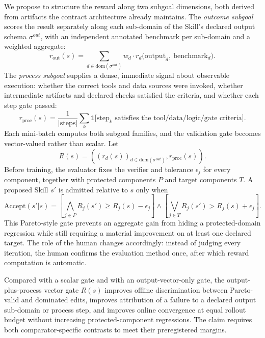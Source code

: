 We propose to structure the reward along two subgoal dimensions, both derived from artifacts the contract architecture already maintains. The \textit{outcome subgoal} scores the result separately along each sub-domain of the Skill's declared output schema $\sigma^{out}$, with an independent annotated benchmark per sub-domain and a weighted aggregate:
\begin{equation}
r_{\mathrm{out}}(s)=\sum_{d\in\mathrm{dom}(\sigma^{out})} w_d \cdot r_d\big(\mathrm{output}_d,\ \mathrm{benchmark}_d\big).
\end{equation}
The \textit{process subgoal} supplies a dense, immediate signal about observable execution: whether the correct tools and data sources were invoked, whether intermediate artifacts and declared checks satisfied the criteria, and whether each step gate passed:
\begin{equation}
r_{\mathrm{proc}}(s)=\frac{1}{|\mathrm{steps}|}\sum_k \mathbb{1}\big[\mathrm{step}_k \text{ satisfies the tool/data/logic/gate criteria}\big].
\end{equation}
Each mini-batch computes both subgoal families, and the validation gate becomes vector-valued rather than scalar. Let
\begin{equation}
R(s)=\left(\left(r_d(s)\right)_{d\in\mathrm{dom}(\sigma^{out})},r_{\mathrm{proc}}(s)\right).
\end{equation}
Before training, the evaluator fixes the verifier and tolerance $\epsilon_j$ for every component, together with protected components $P$ and target components $T$. A proposed Skill $s'$ is admitted relative to $s$ only when
\begin{equation}
\mathrm{Accept}(s'|s)=
\left[\bigwedge_{j\in P}R_j(s')\geq R_j(s)-\epsilon_j\right]
\land
\left[\bigvee_{j\in T}R_j(s')>R_j(s)+\epsilon_j\right].
\end{equation}
This Pareto-style gate prevents an aggregate gain from hiding a protected-domain regression while still requiring a material improvement on at least one declared target. The role of the human changes accordingly: instead of judging every iteration, the human confirms the evaluation method once, after which reward computation is automatic.

\begin{proposition}
\label{prop:p15}
Compared with a scalar gate and with an output-vector-only gate, the output-plus-process vector gate $R(s)$ improves offline discrimination between Pareto-valid and dominated edits, improves attribution of a failure to a declared output sub-domain or process step, and improves online convergence at equal rollout budget without increasing protected-component regressions. The claim requires both comparator-specific contrasts to meet their preregistered margins.
\end{proposition}

